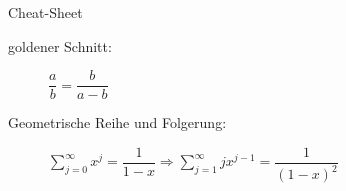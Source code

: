\begin{TOP}{Cheat-Sheet}
\up\up
	\begin{description}
		\item[goldener Schnitt:] $\dfrac{a}{b}=\dfrac{b}{a-b}$
		\item[Geometrische Reihe und Folgerung:] $\sum\limits_{j=0}^{\infty}x^j = \dfrac{1}{1-x} \Rightarrow \sum\limits_{j=1}^{\infty} jx^{j-1} = \dfrac{1}{(1-x)^2}$
	\end{description}
\end{TOP}